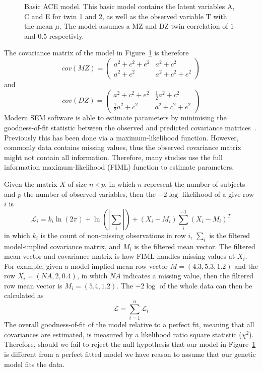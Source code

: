 \begin{figure}[htpb]
  \centering
  \scalebox{0.6}{}
  \caption[ACE Model]{Basic ACE model.
    This basic model contains the latent variables A, C and E for twin 1 and 2, as well as the observed variable T with the mean $\mu$.
    The model assumes a MZ and DZ twin correlation of $1$ and $0.5$ respectivly.
  }\label{fig:ace}
\end{figure}

The covariance matrix of the model in Figure~\ref{fig:ace} is therefore
\begin{equation}
  cov(MZ) = 
  \begin{pmatrix}
    a^2 + c^2 + e^2 & a^2 + c^2 \\
    a^2 + c^2 & a^2 + c^2 + e^2
  \end{pmatrix}
\end{equation}
and 
\begin{equation}
  cov(DZ) = 
  \begin{pmatrix}
    a^2 + c^2 + e^2 & \frac{1}{2}a^2 + c^2 \\
    \frac{1}{2}a^2 + c^2 & a^2 + c^2 + e^2
  \end{pmatrix}
\end{equation}
Modern SEM software is able to estimate parameters by minimising the goodness-of-fit statistic between the observed and predicted covariance matrices~\cite{Boker2011}.
Previously this has been done via a maximum-likelihood function.
However, commonly data contains missing values, thus the observed covariance matrix might not contain all information.
Therefore, many studies use the full information maximum-likelihood (FIML) function to estimate parameters.

Given the matrix $X$ of size $n\times p$, in which $n$ represent the number of subjects and $p$ the number of observed variables, then the $-2\log$ likelihood of a give row $i$ is
\begin{equation}\label{eq:fiml}
  \mathcal{L}_i = k_i \ln(2\pi) + \ln(|\sum_i|) + (X_i-M_i)\sum_i^{-1}(X_i-M_i)^{T} 
\end{equation}
in which $k_i$ is the count of non-missing observations in row $i$, $\sum_i$ is the filtered model-implied covariance matrix, and $M_i$ is the filtered mean vector.
The filtered mean vector and covariance matrix is how FIML handles missing values at $X_i$.
For example, given a model-implied mean row vector $M=(4.3, 5.3, 1.2)$ and the row $X_i=(NA, 2, 0.4)$, in which $NA$ indicates a missing value, then the filtered row mean vector is $M_i = (5.4, 1.2)$. 
The $-2\log$ of the whole data can then be calculated as
\begin{equation}
  \mathcal{L} = \sum^n_{i=1} \mathcal{L}_i
\end{equation}
The overall goodness-of-fit of the model relative to a perfect fit, meaning that all covariances are estimated, is measured by a likelihood ratio square statistic ($\chi^2$).
Therefore, should we fail to reject the null hypothesis that our model in Figure~\ref{fig:ace} is different from a perfect fitted model we have reason to assume that our genetic model fits the data.

